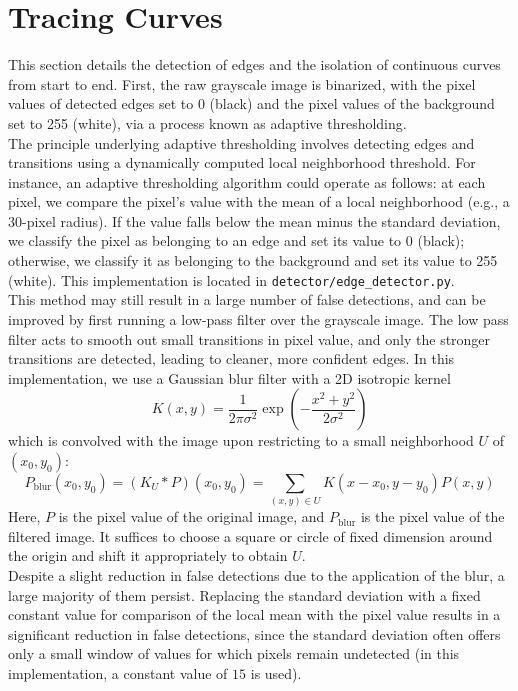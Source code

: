 \documentclass{article}
\begin{document}
\section{Tracing Curves}\label{sec.trace}
This section details the detection of edges and the isolation of continuous curves from start to end. First, the raw grayscale image is binarized, 
with the pixel values of detected edges set to $0$ (black) and the pixel values of the background set to 255 (white), via a process known as adaptive thresholding. \\

The principle underlying adaptive thresholding involves detecting edges and transitions using a dynamically computed local neighborhood threshold.
For instance, an adaptive thresholding algorithm could operate as follows: at each pixel, we compare the pixel's value with the mean of a local neighborhood (e.g., a 30-pixel radius).
If the value falls below the mean minus the standard deviation, we classify the pixel as belonging to an edge and set its value to 0 (black); otherwise, we classify it as belonging to the background and set its value to
255 (white). This implementation is located in \verb|detector/edge_detector.py|. \\

This method may still result in a large number of false detections, and can be improved by first running a low-pass filter over the grayscale image. The low pass filter acts to smooth out small transitions in pixel value, 
and only the stronger transitions are detected, leading to cleaner, more confident edges. In this implementation, we use a Gaussian blur filter with a 2D isotropic kernel
\[
  K(x, y) = \frac{1}{2\pi \sigma^2 }\exp\left(-\frac{x^2 + y^2}{2\sigma^2}\right)
\]
which is convolved with the image upon restricting to a small neighborhood $U$ of $(x_0, y_0)$:
\begin{equation}\label{eq.blur}
  P_{\text{blur}}(x_0, y_0) = (K_U*P)(x_0, y_0) = \sum_{(x, y) \in U}K(x-x_0, y-y_0) P(x, y)
\end{equation}
Here, $P$ is the pixel value of the original image, and $P_{\text{blur}}$ is the pixel value of the filtered image. It suffices to choose a square or circle of fixed dimension 
around the origin and shift it appropriately to obtain $U$. \\

Despite a slight reduction in false detections due to the application of the blur, a large majority of them persist. Replacing the standard deviation with a fixed constant value for comparison of the local mean with the pixel
value results in a significant reduction in false detections, since the standard deviation often offers only a small window of values for which pixels remain undetected (in this implementation, a constant 
value of $15$ is used). \\
\end{document}
